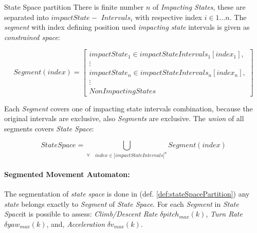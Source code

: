 \begin{definition}{State Space partition}
    There is finite number $n$ of \emph{Impacting States}, these are separated into $impactState-$ $Intervals_i$ with respective index $i \in 1\dots n$. The \emph{segment} with index defining position used \emph{impacting state} intervals is given as \emph{constrained space}:
    
    \begin{equation}
        Segment(index) = \left[
            \begin{gathered}
                impactState_1 \in impactStateIntervals_1[index_1],\\
                \vdots\\
                impactState_n \in impactStateIntervals_n[index_n],\\
                \vdots\\
                NonImpactingStates    
                \end{gathered}\right]
    \end{equation}
    
    Each \emph{Segment} covers one of impacting state intervals combination, because the original intervals are exclusive, also \emph{Segments} are exclusive. The \emph{union} of all segments covers \emph{State Space}:
    
    \begin{equation}\label{eq:segmentedStateSpace}
        StateSpace = \bigcup_{\forall\quad index \in |impactStateIntervals|^n} Segment(index)
    \end{equation}
\end{definition}

\paragraph{Segmented Movement Automaton:} The segmentation of \emph{state space} is done  in (def. \ref{def:stateSpacePartition}) any \emph{state} belongs exactly to \emph{Segment} of \emph{State Space}. For each \emph{Segment} in \emph{State Space}it is possible to assess: \emph{Climb/Descent Rate} $\delta pitch_{max}(k)$, \emph{Turn Rate} $\delta yaw_{max}(k)$, and, \emph{Acceleration} $\delta v_{max}(k)$.

